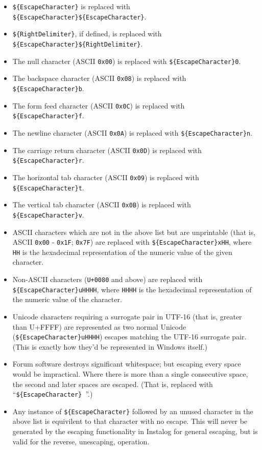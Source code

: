 \documentclass[letterpaper,12pt]{article}
\newcommand{\var}[1]{\texttt{\$\{#1\}}}
\begin{document}
\begin{itemize}
    \item \var{EscapeCharacter} is replaced with
    \var{EscapeCharacter}\var{EscapeCharacter}.
    \item \var{RightDelimiter}, if defined,  is replaced with
    \var{EscapeCharacter}\var{RightDelimiter}.
    \item The null character (ASCII \verb|0x00|) is replaced with
    \var{EscapeCharacter}\texttt{0}.
    \item The backspace character (ASCII \verb|0x08|) is replaced with
    \var{EscapeCharacter}\texttt{b}.
    \item The form feed character (ASCII \verb|0x0C|) is replaced with
    \var{EscapeCharacter}\texttt{f}.
    \item The newline character (ASCII \verb|0x0A|) is replaced with
    \var{EscapeCharacter}\texttt{n}.
    \item The carriage return character (ASCII \verb|0x0D|) is replaced with
    \var{EscapeCharacter}\texttt{r}.
    \item The horizontal tab character (ASCII \verb|0x09|) is replaced with
    \var{EscapeCharacter}\texttt{t}.
    \item The vertical tab character (ASCII \verb|0x0B|) is replaced with
    \var{EscapeCharacter}\texttt{v}.
    \item ASCII characters which are not in the above list but are unprintable
    (that is, ASCII \verb|0x00| - \verb|0x1F|; \verb|0x7F|) are
    replaced with \var{EscapeCharacter}\texttt{xHH}, where \texttt{HH} is the
    hexadecimal representation of the numeric value of the given character.
    \item Non-ASCII characters (\verb|U+0080| and above) are replaced with
    \var{EscapeCharacter}\texttt{uHHHH}, where \texttt{HHHH} is the hexadecimal
    representation of the numeric value of the character.
    \item Unicode characters requiring a surrogate pair in UTF-16 (that is,
    greater than U+FFFF) are represented as two normal Unicode
    (\var{EscapeCharacter}\texttt{uHHHH}) escapes matching the UTF-16 surrogate
    pair. (This is exactly how they'd be represented in Windows itself.)
    \item Forum software destroys significant whitespace; but escaping every
    space would be impractical. Where there is more than a single consecutive
    space, the second and later spaces are escaped. (That is, replaced with
    ``\var{EscapeCharacter}\texttt{ }''.)
    \item Any instance of \var{EscapeCharacter} followed by an unused character
    in the above list is equivilent to that character with no escape. This will
    never be generated by the escaping functionality in Instalog for general
    escaping, but is valid for the reverse, unescaping, operation.
\end{itemize}
\end{document}
